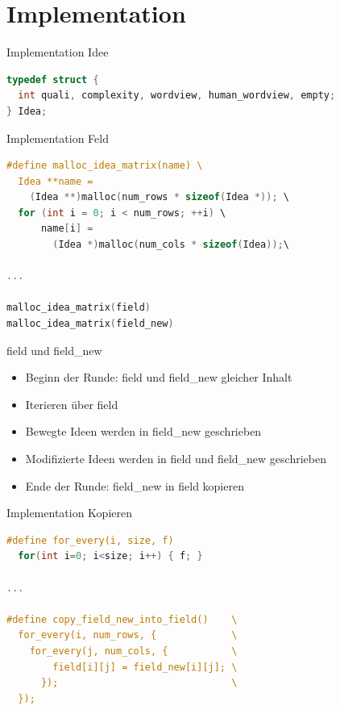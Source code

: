 \section{Implementation}

\begin{frame}[fragile]{Implementation Idee}
	\begin{lstlisting}[language=C,basicstyle=\small,breaklines=true,keywordstyle=\color{black}]
typedef struct {
  int quali, complexity, wordview, human_wordview, empty;
} Idea;
	  \end{lstlisting}
\end{frame}

\begin{frame}[fragile]{Implementation Feld}
	\begin{lstlisting}[language=C,basicstyle=\small,breaklines=true,keywordstyle=\color{black}]
#define malloc_idea_matrix(name) \
  Idea **name = 
    (Idea **)malloc(num_rows * sizeof(Idea *)); \
  for (int i = 0; i < num_rows; ++i) \
      name[i] = 
        (Idea *)malloc(num_cols * sizeof(Idea));\

...

malloc_idea_matrix(field)
malloc_idea_matrix(field_new)
\end{lstlisting}
\end{frame}


\begin{frame}{field und field\_new}
\begin{itemize}
  \item Beginn der Runde: field und field\_new gleicher Inhalt
  \item Iterieren über field
  \item Bewegte Ideen werden in field\_new geschrieben
  \item Modifizierte Ideen werden in field und field\_new geschrieben
  \item Ende der Runde: field\_new in field kopieren
\end{itemize}
\end{frame}

\begin{frame}[fragile]{Implementation Kopieren}
	\begin{lstlisting}[language=C,basicstyle=\small,breaklines=true,keywordstyle=\color{black}]
#define for_every(i, size, f) 
  for(int i=0; i<size; i++) { f; }

... 

#define copy_field_new_into_field()    \
  for_every(i, num_rows, {             \
    for_every(j, num_cols, {           \
        field[i][j] = field_new[i][j]; \
      });                              \
  }); 
	  \end{lstlisting}
\end{frame}

